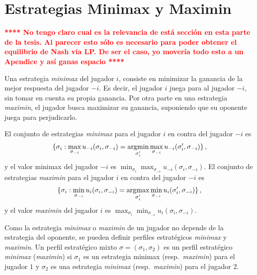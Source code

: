 \chapter{Estrategias Minimax y Maximin}
\label{apex:chapter:estrategias}

\textcolor{red}{\bf ***** No tengo claro cual es la relevancia de está sección en esta parte de la tesis. Al parecer esto sólo es necesario para poder obtener el equilibrio de Nash via LP. De ser el caso, yo movería todo esto a un Apendice y así ganas espacio ****}

Una estrategia \textit{minimax} del jugador $i$, consiste en minimizar la ganancia de la mejor respuesta del jugador $-i$. Es decir, el jugador $i$ juega para  al jugador $-i$, sin tomar en cuenta su propia ganancia. Por otra parte en una estrategia \textit{maximin}, el jugador busca maximizar su ganancia, suponiendo que su oponente juega para perjudicarlo.

\begin{definition}
El conjunto de estrategias \textit{minimax} para el jugador $i$ en contra del jugador $-i$ es
\begin{alignat}{1}
\{ \sigma_i : \max_{\sigma_{-i}}u_{-i}(\sigma_i, \sigma_{-i}) = \operatorname*{\arg\!\min}_{\sigma'_i}{\max_{\sigma_{-i}} u_{-i}(\sigma'_i, \sigma_{-i})} \}\,,
\end{alignat}
y el valor minimax del jugador $-i$ es $\min_{\sigma_i}{\max_{\sigma_{-i}}{u_{-i}(\sigma_i, \sigma_{-i})}}$.
El conjunto de estrategias \textit{maximin} para el jugador $i$ en contra del jugador $-i$ es
\begin{alignat}{1}
\{ \sigma_i : \min_{\sigma_{-i}}u_i(\sigma_i, \sigma_{-i}) = \operatorname*{\arg\!\max}_{\sigma'_i}{\min_{\sigma_{-i}} u_i(\sigma'_i, \sigma_{-i})} \}\,,
\end{alignat}
y el valor \textit{maximin} del jugador $i$ es $\max_{\sigma_i}{\min_{\sigma_{-i}}{u_i(\sigma_i, \sigma_{-i})}}$.
\end{definition}

Como la estrategia \textit{minimax} o \textit{maximin} de un jugador no depende de la estrategia del oponente, se pueden definir perfiles estratégicos \textit{minimax} y \textit{maximin}. Un perfil estratégico mixto $\sigma = (\sigma_1, \sigma_2)$ es un perfil estratégico \textit{minimax} (\textit{maximin}) si $\sigma_1$ es un estrategia minimax (resp.\ \textit{maximin}) para el jugador $1$ y $\sigma_2$ es una estrategia \textit{minimax} (resp.\ \textit{maximin}) para el jugador $2$.

